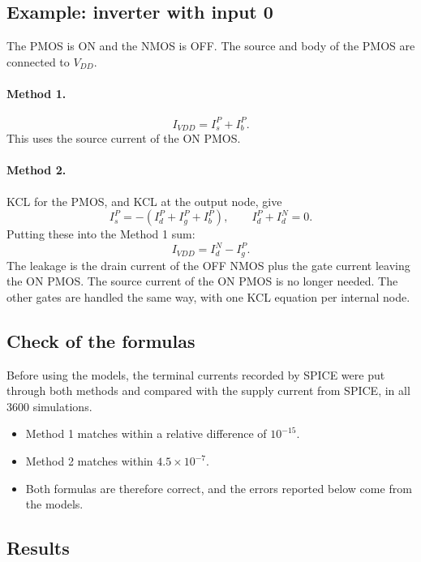 \documentclass{article}
\begin{document}
\subsection{Example: inverter with input 0}

The PMOS is ON and the NMOS is OFF. The source and body of the PMOS are
connected to $V_{DD}$.

\paragraph{Method 1.}
\begin{equation}
I_{VDD} = I_s^{P} + I_b^{P}.
\end{equation}
This uses the source current of the ON PMOS.

\paragraph{Method 2.}
KCL for the PMOS, and KCL at the output node, give
\begin{equation}
I_s^{P} = -\left(I_d^{P} + I_g^{P} + I_b^{P}\right), \qquad
I_d^{P} + I_d^{N} = 0.
\end{equation}
Putting these into the Method 1 sum:
\begin{equation}
I_{VDD} = I_d^{N} - I_g^{P}.
\end{equation}
The leakage is the drain current of the OFF NMOS plus the gate current
leaving the ON PMOS. The source current of the ON PMOS is no longer needed.
The other gates are handled the same way, with one KCL equation per internal
node.

\subsection{Check of the formulas}

Before using the models, the terminal currents recorded by SPICE were put
through both methods and compared with the supply current from SPICE, in all
3600 simulations.
\begin{itemize}
    \item Method 1 matches within a relative difference of $10^{-15}$.
    \item Method 2 matches within $4.5 \times 10^{-7}$.
    \item Both formulas are therefore correct, and the errors reported below
          come from the models.
\end{itemize}

\subsection{Results}
\end{document}
